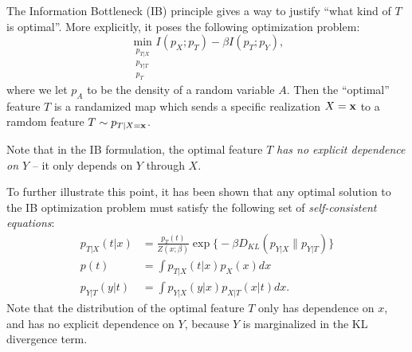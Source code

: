 The Information Bottleneck (IB) principle gives a way to justify ``what kind of $T$ is optimal''. More explicitly, it poses the following optimization problem:
\[
	\min_{\substack{p_{T|X}\\ p_{Y|T}\\ p_T}} I(p_X; p_T) - \beta I(p_T; p_Y),
\]
where we let $p_A$ to be the density of a random variable $A$. Then the ``optimal'' feature $T$ is a randamized map which sends a specific realization $X = {\mathbf{x}}$ to a ramdom feature $T \sim p_{T|X={\mathbf{x}}}$. 

Note that in the IB formulation, the optimal feature $T$ \emph{has no explicit dependence on $Y$} -- it only depends on $Y$ through $X$.

To further illustrate this point, it has been shown that any optimal solution to the IB optimization problem must satisfy the following set of \emph{self-consistent equations}:
\begin{align*}
	p_{T|X}(t|x)& = \frac{p_T(t)}{Z(x; \beta)} \exp\bigg\{ -\beta D_{KL}(p_{Y|X} \| p_{Y|T})\bigg\}\\
	p(t) & = \int p_{T|X}(t | x) p_X(x) dx \\
	p_{Y|T}(y|t) & = \int p_{Y|X}(y|x) p_{X|T}(x|t) dx.
\end{align*}
Note that the distribution of the optimal feature $T$ only has dependence on $x$, and has no explicit dependence on $Y$, because $Y$ is marginalized in the KL divergence term.
\fi

